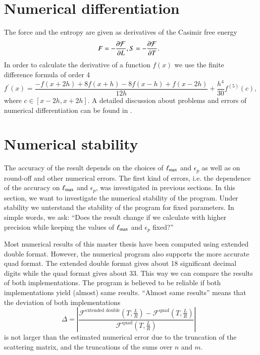 \section{Numerical differentiation}

The force and the entropy are given as derivatives of the Casimir free energy
\begin{equation}
F = -\frac{\partial\mathcal{F}}{\partial L}, \\
S = -\frac{\partial\mathcal{F}}{\partial T}.
\end{equation}
In order to calculate the derivative of a function $f(x)$ we use the
finite difference formula of order 4 \cite{Fornberg88}
\begin{equation}
f^\prime(x) = \frac{-f(x+2h)+8f(x+h)-8f(x-h)+f(x-2h)}{12h} + \frac{h^4}{30}f^{(5)}(c),
\end{equation}
where $c\in [x-2h, x+2h]$. A detailed discussion about problems and errors of
numerical differentiation can be found in \cite{NumericalRecipesInFortran}.


\section{Numerical stability}

The accuracy of the result depends on the choices of ${\ell_\text{max}}$ and $\epsilon_p$
as well as on round-off and other numerical errors. The first kind of errors,
i.e. the dependence of the accuracy on ${\ell_\text{max}}$ and $\epsilon_p$, was investigated in
previous sections. In this section, we want to investigate the numerical
stability of the program. Under stability we unterstand the stability of the
program for fixed parameters. In simple words, we ask: ``Does the result change
if we calculate with higher precision while keeping the values of ${\ell_\text{max}}$ and
$\epsilon_p$ fixed?''

Most numerical results of this master thesis have been computed using extended double
format. However, the numerical program also supports the more accurate quad
format. The extended double format gives about 18 significant decimal digits
while the quad format gives about 33. This way we can compare the
results of both implementations. The program is believed to be reliable if
both implementations yield (almost) same results. ``Almost same results'' means
that the deviation of both implementations
\begin{equation}
\Delta = \left| \frac{\mathcal{F}^\text{extended double}\left(T, \frac{L}{R}\right) - \mathcal{F}^\text{quad}\left(T, \frac{L}{R}\right)}{\mathcal{F}^\text{quad}\left(T, \frac{L}{R}\right)} \right|
\end{equation}
is not larger than the estimated numerical error due to the truncation of the
scattering matrix, and the truncations of the sums over $n$ and $m$.

